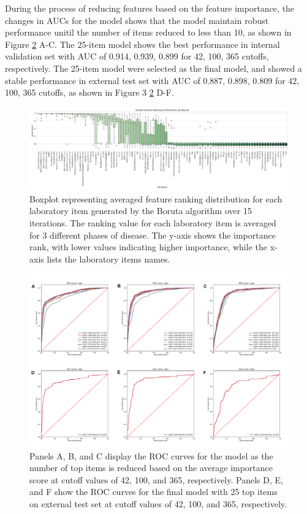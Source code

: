 \documentclass[final,1p,times,authoryear]{elsarticle}
\begin{document}
During the process of reducing features based on the feature importance, the changes in AUCs for the model shows that the model maintain robust performance unitil the number of items reduced to less than 10, as shown in Figure \ref{topn_extval25} A-C. The 25-item model shows the best performance in internal validation set with AUC of 0.914, 0.939, 0.899 for 42, 100, 365 cutoffs, respectively. The 25-item model were selected as the final model, and showed a stable performance in external test set with AUC of 0.887, 0.898, 0.809 for 42, 100, 365 cutoffs, as shown in Figure 3 \ref{topn_extval25} D-F.


\begin{figure}[t] 
    \centering
    \includegraphics[width=\textwidth]{figures/boruta_by_group.png} 
    \caption{Boxplot representing averaged feature ranking distribution for each laboratory item generated by the Boruta algorithm over 15 iterations. The ranking value for each laboratory item is averaged for 3 different phases of disease. The y-axis shows the importance rank, with lower values indicating higher importance, while the x-axis lists the laboratory items names.}\label{boruta_by_group}
\end{figure}


\begin{figure}[t]  
    \centering 
    \includegraphics[width=\textwidth]{figures/topn_extval25.png} 
    \caption{Panels A, B, and C display the ROC curves for the model as the number of top items is reduced based on the average importance score at cutoff values of 42, 100, and 365, respectively. Panels D, E, and F show the ROC curves for the final model with 25 top items on external test set at cutoff values of 42, 100, and 365, respectively.}\label{topn_extval25}

\end{figure}
\end{document}
